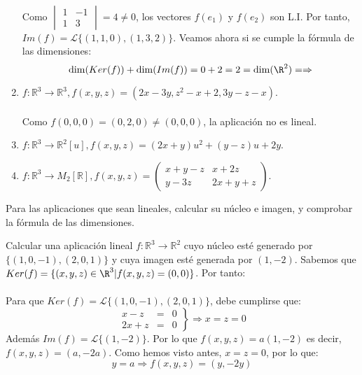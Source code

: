 \begin{ejercicio}
\begin{enumerate}
\begin{align*}
		      \end{align*}
		      Como $\begin{vmatrix}
				      1 & -1 \\
				      1 & 3
			      \end{vmatrix} = 4 \neq 0$, los vectores $f(e_1)$ y $f(e_2)$ son L.I.
		      Por tanto, $Im(f) = \mathcal{L}\{(1,1,0),(1,3,2)\}$. Veamos ahora si se cumple la fórmula de las dimensiones:
		      \begin{equation*}
			      \dim(Ker(f))+\dim(Im(f)) = 0+2 = 2 = \dim(\R^2) = \Rightarrow
		      \end{equation*}
		\item \( f: \mathbb{R}^3 \rightarrow \mathbb{R}^3, f(x,y,z) = (2x - 3y, z^2 - x + 2, 3y - z - x) \).
		      \\ \\
		      Como $f(0,0,0) = (0,2,0) \neq (0,0,0)$, la aplicación no es lineal.
		\item \( f: \mathbb{R}^3 \rightarrow \mathbb{R}^2[u], f(x,y,z) = (2x + y)u^2 + (y - z)u + 2y \).
		\item \( f: \mathbb{R}^3 \rightarrow M_2[\mathbb{R}], f(x,y,z) = \begin{pmatrix} x + y - z & x + 2z \\ y - 3z & 2x + y + z \end{pmatrix} \).
	\end{enumerate}
	Para las aplicaciones que sean lineales, calcular su núcleo e imagen, y comprobar la fórmula de las dimensiones.
\end{ejercicio}

\begin{ejercicio} Calcular una aplicación lineal \( f: \mathbb{R}^3 \rightarrow \mathbb{R}^2 \) cuyo núcleo esté generado por \( \{(1,0,-1), (2,0,1)\} \) y cuya imagen esté generada por \( (1, -2) \).
	Sabemos que $Ker(f) = \{(x,y,z) \in \R^3 | f(x,y,z) = (0,0)\}$. Por tanto: \\ \\
	Para que $Ker(f) = \mathcal{L}\{(1,0,-1),(2,0,1)\}$, debe cumplirse que:
	\begin{equation*}
		\left.
		\begin {array}{rcl}
		x-z & = & 0 \\
		2x+z & = & 0
		\end {array}
		\right\} \Rightarrow x=z=0
	\end{equation*}
	Además $Im(f) = \mathcal{L}\{(1,-2)\}$. Por lo que $f(x,y,z) = a(1,-2)$ es decir, $f(x,y,z) = (a,-2a)$. Como hemos visto antes, $x=z=0$, por lo que:
	\begin{equation*}
		y = a \Rightarrow f(x,y,z) = (y,-2y)
	\end{equation*}
\end{ejercicio}

